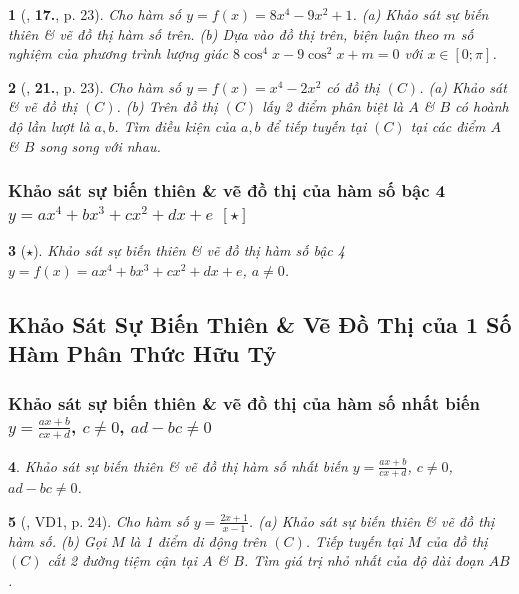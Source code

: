 \documentclass{article}
\newtheorem{baitoan}{}
\begin{document}
\begin{baitoan}[\cite{TLCT_giai_tich_12}, \textbf{17.}, p. 23]
	Cho hàm số $y = f(x) = 8x^4 - 9x^2 + 1$. (a) Khảo sát sự biến thiên \& vẽ đồ thị hàm số trên. (b) Dựa vào đồ thị trên, biện luận theo $m$ số nghiệm của phương trình lượng giác $8\cos^4x - 9\cos^2x + m = 0$ với $x\in[0;\pi]$.
\end{baitoan}

\begin{baitoan}[\cite{TLCT_giai_tich_12}, \textbf{21.}, p. 23]
	Cho hàm số $y = f(x) = x^4 - 2x^2$ có đồ thị $(C)$. (a) Khảo sát \& vẽ đồ thị $(C)$. (b) Trên đồ thị $(C)$ lấy 2 điểm phân biệt là $A$ \& $B$ có hoành độ lần lượt là $a,b$. Tìm điều kiện của $a,b$ để tiếp tuyến tại $(C)$ tại các điểm $A$ \& $B$ song song với nhau.
\end{baitoan}

\subsubsection{Khảo sát sự biến thiên \& vẽ đồ thị của hàm số bậc 4 $y = ax^4 + bx^3 + cx^2 + dx + e$ $[\star]$}

\begin{baitoan}[$\star$]
	Khảo sát sự biến thiên \& vẽ đồ thị hàm số bậc 4 $y = f(x) = ax^4 + bx^3 + cx^2 + dx + e$, $a\ne 0$.
\end{baitoan}


\subsection{Khảo Sát Sự Biến Thiên \& Vẽ Đồ Thị của 1 Số Hàm Phân Thức Hữu Tỷ}

\subsubsection{Khảo sát sự biến thiên \& vẽ đồ thị của hàm số nhất biến $y = \frac{ax + b}{cx + d}$, $c\ne 0$, $ad - bc\ne 0$}

\begin{baitoan}
	Khảo sát sự biến thiên \& vẽ đồ thị hàm số nhất biến $y = \frac{ax + b}{cx + d}$, $c\ne 0$, $ad - bc\ne 0$.
\end{baitoan}

\begin{baitoan}[\cite{TLCT_giai_tich_12}, VD1, p. 24]
	Cho hàm số $y = \frac{2x + 1}{x - 1}$. (a) Khảo sát sự biến thiên \& vẽ đồ thị hàm số. (b) Gọi $M$ là 1 điểm di động trên $(C)$. Tiếp tuyến tại $M$ của đồ thị $(C)$ cắt 2 đường tiệm cận tại $A$ \& $B$. Tìm giá trị nhỏ nhất của độ dài đoạn $AB$.
\end{baitoan}
\end{document}
